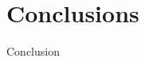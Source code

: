 \documentclass{sig-alternate-ipsn13}
\begin{document}
\section{Conclusions}
Conclusion


%

%
%


\end{document}

